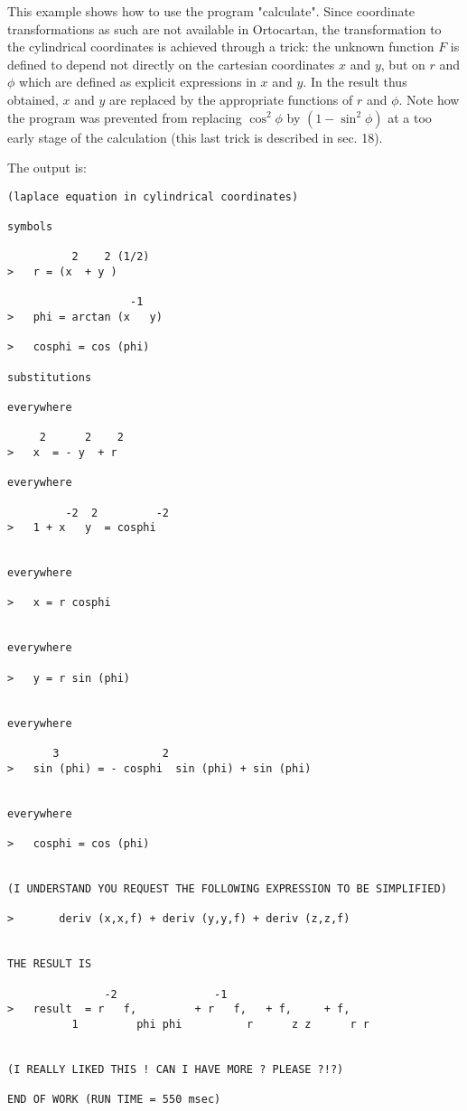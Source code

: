 This example shows how to use  the  program  "calculate".
     Since coordinate transformations as such are  not  available
in Ortocartan, the transformation to the cylindrical  coordinates is achieved
through a trick: the unknown  function  $F$ is defined to depend not directly
on  the  cartesian  coordinates $x$ and $y$, but on $r$ and $\phi$ which are
defined as  explicit expressions in $x$ and $y$. In the result thus  obtained,
$x$ and $y$ are replaced by the appropriate functions of  $r$  and $\phi$. Note
how  the  program  was  prevented  from  replacing $\cos^2 \phi$  by $(1 -
\sin^2 \phi)$ at a too early stage of the calculation (this last trick is
described in sec. 18).

The output is:

\bigskip

\begin{verbatim}
(laplace equation in cylindrical coordinates)

symbols

          2    2 (1/2)
>   r = (x  + y )

                   -1
>   phi = arctan (x   y)

>   cosphi = cos (phi)

substitutions

everywhere

     2      2    2
>   x  = - y  + r

everywhere

         -2  2         -2
>   1 + x   y  = cosphi


everywhere

>   x = r cosphi


everywhere

>   y = r sin (phi)


everywhere

       3                2
>   sin (phi) = - cosphi  sin (phi) + sin (phi)


everywhere

>   cosphi = cos (phi)


(I UNDERSTAND YOU REQUEST THE FOLLOWING EXPRESSION TO BE SIMPLIFIED)

>       deriv (x,x,f) + deriv (y,y,f) + deriv (z,z,f)


THE RESULT IS

               -2               -1
>   result  = r   f,         + r   f,   + f,     + f,
          1         phi phi          r      z z      r r


(I REALLY LIKED THIS ! CAN I HAVE MORE ? PLEASE ?!?)

END OF WORK (RUN TIME = 550 msec)

\end{verbatim}

